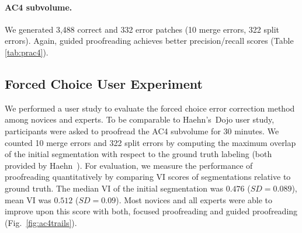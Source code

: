 \paragraph{AC4 subvolume.} We generated 3,488 correct and 332 error patches (10 merge errors, 322 split errors). Again, guided proofreading achieves better precision/recall scores (Table \ref{tab:prac4}).

\begin{table}[t]
\caption{Classifier comparison on correct and split error patches of the AC4 subvolume.}%
\label{tab:prac4}
\end{table}

\subsection{Forced Choice User Experiment}
We performed a user study to evaluate the forced choice error correction method among novices and experts. To be comparable to Haehn's~\etal Dojo user study, participants were asked to proofread the AC4 subvolume for 30 minutes. We counted 10 merge errors and 322 split errors by computing the maximum overlap of the initial segmentation with respect to the ground truth labeling (both provided by Haehn~\etal). For evaluation, we measure the performance of proofreading quantitatively by comparing VI scores of segmentations relative to ground truth. The median VI of the initial segmentation was $0.476$ ($SD=0.089$), mean VI was $0.512$ ($SD=0.09$). Most novices and all experts were able to improve upon this score with both, focused proofreading and guided proofreading (Fig.~\ref{fig:ac4trails}).

